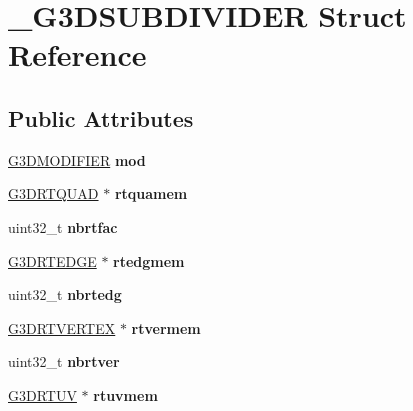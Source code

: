 \hypertarget{struct__G3DSUBDIVIDER}{}\section{\+\_\+\+G3\+D\+S\+U\+B\+D\+I\+V\+I\+D\+ER Struct Reference}
\label{struct__G3DSUBDIVIDER}
\subsection*{Public Attributes}
\begin{DoxyCompactItemize}
\item 
\mbox{\label{struct__G3DSUBDIVIDER_aed7a2c7a687fd9b2411f33d08a7bbb56}} 
\hyperlink{struct__G3DMODIFIER}{G3\+D\+M\+O\+D\+I\+F\+I\+ER} {\bfseries mod}
\item 
\mbox{\label{struct__G3DSUBDIVIDER_a2310ddc51dbca7e3ada4d82693c7dc11}} 
\hyperlink{struct__G3DRTQUAD}{G3\+D\+R\+T\+Q\+U\+AD} $\ast$ {\bfseries rtquamem}
\item 
\mbox{\label{struct__G3DSUBDIVIDER_a75cf0a877e509f906242c5c2f448d3c0}} 
uint32\+\_\+t {\bfseries nbrtfac}
\item 
\mbox{\label{struct__G3DSUBDIVIDER_a031210ca8cf45ccb9845790344ddec3c}} 
\hyperlink{struct__G3DRTEDGE}{G3\+D\+R\+T\+E\+D\+GE} $\ast$ {\bfseries rtedgmem}
\item 
\mbox{\label{struct__G3DSUBDIVIDER_a6ce736a43236eb65ce26612e71b9c452}} 
uint32\+\_\+t {\bfseries nbrtedg}
\item 
\mbox{\label{struct__G3DSUBDIVIDER_aca4f09942a0841a4ad965e81fd619fd3}} 
\hyperlink{struct__G3DRTVERTEX}{G3\+D\+R\+T\+V\+E\+R\+T\+EX} $\ast$ {\bfseries rtvermem}
\item 
\mbox{\label{struct__G3DSUBDIVIDER_ac6f1b756e85ef514f453b3999c6f2a8e}} 
uint32\+\_\+t {\bfseries nbrtver}
\item 
\mbox{\label{struct__G3DSUBDIVIDER_a0b85a2e9a504da4540e629f760e3f7c6}} 
\hyperlink{struct__G3DRTUV}{G3\+D\+R\+T\+UV} $\ast$ {\bfseries rtuvmem}

\end{DoxyCompactItemize}

